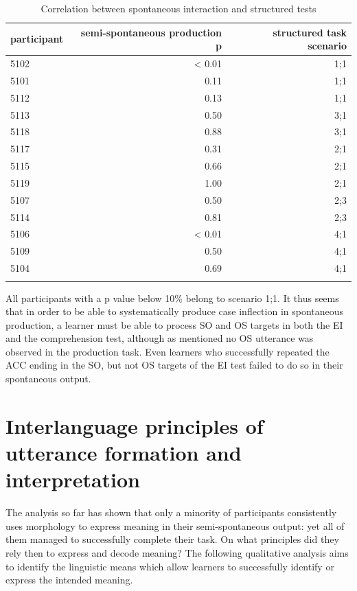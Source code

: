 \begin{table}
    \begin{tabularx}{\textwidth}{lrr}
        \lsptoprule
         participant & semi-spontaneous production p & structured task scenario\\
         \midrule
         5102 & < 0.01 & 1;1\\
         5101 & 0.11 & 1;1\\
         5112 & 0.13 & 1;1\\
         5113 & 0.50 & 3;1\\
         5118 & 0.88 & 3;1\\
         5117 & 0.31 & 2;1\\
         5115 & 0.66 & 2;1\\
         5119 & 1.00 & 2;1\\
         5107 & 0.50 & 2;3\\
         5114 & 0.81 & 2;3\\
         5106 & < 0.01 & 4;1\\
         5109 & 0.50 & 4;1\\
         5104 & 0.69 & 4;1\\
        \lspbottomrule
    \end{tabularx}
    \caption{Correlation between spontaneous interaction and structured tests}
    \label{tab:07:6}
\end{table}

All participants with a p value below 10\% belong to scenario 1;1. It thus seems that in order to be able to systematically produce case inflection in spontaneous production, a learner must be able to process SO and OS targets in both the EI and the comprehension test, although as mentioned no OS utterance was observed in the production task. Even learners who successfully repeated the ACC ending in the SO, but not OS targets of the EI test failed to do so in their spontaneous output.

\section{Interlanguage principles of utterance formation and interpretation}\label{sec:07:5}

The analysis so far has shown that only a minority of participants consistently uses morphology to express meaning in their semi-spontaneous output: yet all of them managed to successfully complete their task. On what principles did they rely then to express and decode meaning? The following qualitative analysis aims to identify the linguistic means which allow learners to successfully identify or express the intended meaning.

